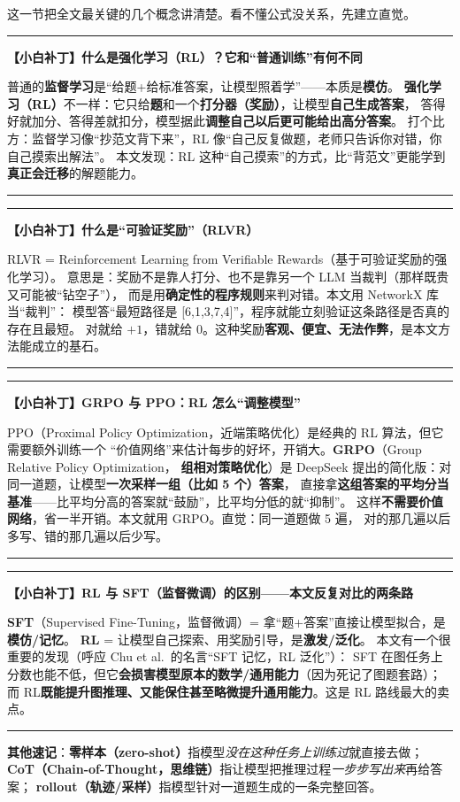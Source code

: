 \documentclass[11pt,UTF8,fontset=fandol]{ctexart}
\newenvironment{tip}[1]{%
  \par\smallskip\noindent\rule{\linewidth}{0.4pt}\par\nobreak
  \noindent\textbf{【小白补丁】#1}\par\nobreak\noindent\ignorespaces
}{%
  \par\noindent\rule{\linewidth}{0.4pt}\par\smallskip
}
\begin{document}
这一节把全文最关键的几个概念讲清楚。看不懂公式没关系，先建立直觉。

\begin{tip}{什么是强化学习（RL）？它和“普通训练”有何不同}
普通的\textbf{监督学习}是“给题+给标准答案，让模型照着学”——本质是\textbf{模仿}。
\textbf{强化学习（RL）}不一样：它只给\textbf{题}和一个\textbf{打分器（奖励）}，让模型\textbf{自己生成答案}，
答得好就加分、答得差就扣分，模型据此\textbf{调整自己以后更可能给出高分答案}。
打个比方：监督学习像“抄范文背下来”，RL 像“自己反复做题，老师只告诉你对错，你自己摸索出解法”。
本文发现：RL 这种“自己摸索”的方式，比“背范文”更能学到\textbf{真正会迁移}的解题能力。
\end{tip}

\begin{tip}{什么是“可验证奖励”（RLVR）}
RLVR = Reinforcement Learning from Verifiable Rewards（基于可验证奖励的强化学习）。
意思是：奖励不是靠人打分、也不是靠另一个 LLM 当裁判（那样既贵又可能被“钻空子”），
而是用\textbf{确定性的程序规则}来判对错。本文用 NetworkX 库当“裁判”：
模型答“最短路径是 [6,1,3,7,4]”，程序就能立刻验证这条路径是否真的存在且最短。
对就给 $+1$，错就给 $0$。这种奖励\textbf{客观、便宜、无法作弊}，是本文方法能成立的基石。
\end{tip}

\begin{tip}{GRPO 与 PPO：RL 怎么“调整模型”}
PPO（Proximal Policy Optimization，近端策略优化）是经典的 RL 算法，但它需要额外训练一个
“价值网络”来估计每步的好坏，开销大。\textbf{GRPO}（Group Relative Policy Optimization，
\textbf{组相对策略优化}）是 DeepSeek 提出的简化版：对同一道题，让模型\textbf{一次采样一组（比如 5 个）答案}，
直接拿\textbf{这组答案的平均分当基准}——比平均分高的答案就“鼓励”，比平均分低的就“抑制”。
这样\textbf{不需要价值网络}，省一半开销。本文就用 GRPO。直觉：同一道题做 5 遍，
对的那几遍以后多写、错的那几遍以后少写。
\end{tip}

\begin{tip}{RL 与 SFT（监督微调）的区别——本文反复对比的两条路}
\textbf{SFT}（Supervised Fine-Tuning，监督微调）= 拿“题+答案”直接让模型拟合，是\textbf{模仿/记忆}。
\textbf{RL} = 让模型自己探索、用奖励引导，是\textbf{激发/泛化}。
本文有一个很重要的发现（呼应 Chu et al.\ 的名言“SFT 记忆，RL 泛化”）：
SFT 在图任务上分数也能不低，但它\textbf{会损害模型原本的数学/通用能力}（因为死记了图题套路）；
而 RL\textbf{既能提升图推理、又能保住甚至略微提升通用能力}。这是 RL 路线最大的卖点。
\end{tip}

\noindent\textbf{其他速记}：\textbf{零样本（zero-shot）}指模型\emph{没在这种任务上训练过}就直接去做；
\textbf{CoT（Chain-of-Thought，思维链）}指让模型把推理过程\emph{一步步写出来}再给答案；
\textbf{rollout（轨迹/采样）}指模型针对一道题生成的一条完整回答。
\end{document}
